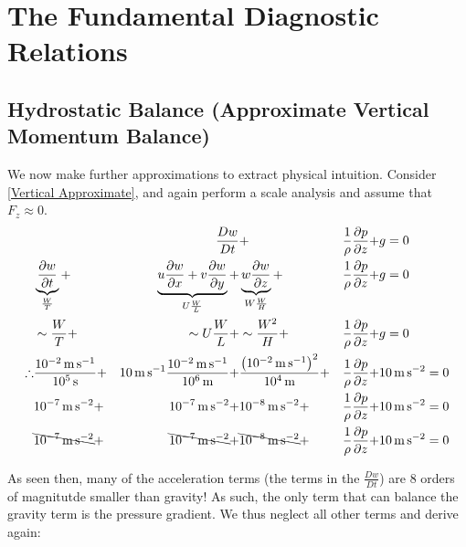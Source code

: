 \chapter{The Fundamental Diagnostic Relations}

\section{Hydrostatic Balance (Approximate Vertical Momentum Balance)}

We now make further approximations to extract physical intuition. Consider \ref{Vertical Approximate}, and again perform a scale analysis and assume that $F_z\approx 0$.
\begin{align*}
    &&\frac{Dw}{Dt} &+
    & \frac{1}{\rho}\frac{\partial p}{\partial z}+
    &g=0
    \\
    &\underbrace{\frac{\partial w}{\partial t}}_{\frac{W}{T}}+ 
    &\underbrace{u\frac{\partial w}{\partial x} 
    + v\frac{\partial w}{\partial y}}_{U\frac{W}{L}}+ 
    &\underbrace{w\frac{\partial w}{\partial z}}_{W\frac{W}{H}}+ 
    &\frac{1}{\rho}\frac{\partial p}{\partial z}+
    &g=0
    \\
    &\sim\frac{W}{T}+
    &\sim U\frac{W}{L}+
    &\sim\frac{W^2}{H}+ 
    &\frac{1}{\rho}\frac{\partial p}{\partial z}+
    &g=0
    \\
    \therefore
    &\frac{\text{\qty{e-2}{\metre\per\second}}}{\text{\qty{e5}{\second}}}+ 
    &\text{\qty{10}{\metre\per\second}}\frac{\text{\qty{e-2}{\metre\per\second}}}{\text{\qty{e6}{\metre}}}+ 
    &\frac{\left( \text{\qty{e-2}{\metre\per\second}} \right)^2}{\text{\qty{e4}{\metre}}}+ 
    &\frac{1}{\rho}\frac{\partial p}{\partial z}+
    &\text{\qty{10}{\metre\per\second\squared}}=0
    \\
    &\text{\qty{e-7}{\metre\per\second\squared}}+
    &\text{\qty{e-7}{\metre\per\second\squared}}+
    &\text{\qty{e-8}{\metre\per\second\squared}}+
    &\frac{1}{\rho}\frac{\partial p}{\partial z}+
    &\text{\qty{10}{\metre\per\second\squared}}=0
    \\
    &\bcancel{\text{\qty{e-7}{\metre\per\second\squared}}}+
    &\bcancel{\text{\qty{e-7}{\metre\per\second\squared}}}+
    &\bcancel{\text{\qty{e-8}{\metre\per\second\squared}}}+
    &\frac{1}{\rho}\frac{\partial p}{\partial z}+
    &\text{\qty{10}{\metre\per\second\squared}}=0
\end{align*}

As seen then, many of the acceleration terms (the terms in the $\frac{Dw}{Dt}$) are 8 orders of magnitutde smaller than gravity! As such, the only term that can balance the gravity term is the pressure gradient. We thus neglect all other terms and derive again:

